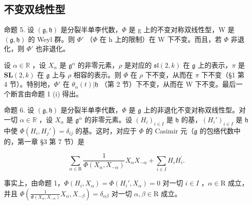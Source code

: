 \subsection{不变双线性型}

命题 5. 设 \((\mathfrak{g},\mathfrak{h})\) 是分裂半单李代数，\(\Phi\) 是 g 上的不变对称双线性型，W 是 \((\mathfrak{g},\mathfrak{h})\) 的 Weyl 群。则 \(\Phi'\) （\(\Phi\) 在 h 上的限制）在 W 下不变。而且，若 \(\Phi\) 非退化，则 \(\Phi'\) 也非退化。

设 \(\alpha \in \mathbb{R}\) ，设 \(X_{\alpha}\) 是 \(\mathfrak{g}^{\alpha}\) 的非零元素，\(\rho\) 是对应的 \(\mathfrak{sl}(2,k)\) 在 \(\mathfrak{g}\) 上的表示，\(\pi\) 是 \(\mathbf{SL}(2,k)\) 在 \(\mathfrak{g}\) 上与 \(\rho\) 相容的表示。则 \(\varPhi\) 在 \(\rho\) 下不变，从而在 \(\pi\) 下不变（§1 第 4 节）。特别地，\(\varPhi'\) 在 \(\theta_{\alpha}(t)|\mathfrak{h}\) （第 2 节）下不变，从而在 W 下不变。最后一个断言由命题 1 (i) 得出。

命题 6. 设 \((\mathfrak{g},\mathfrak{h})\) 是分裂半单李代数，\(\varPhi\) 是 \(\mathfrak{g}\) 上的非退化不变对称双线性型。对一切 \(\alpha \in \mathbb{R}\) ，设 \(X_{\alpha}\) 是 \(\mathfrak{g}^{\alpha}\) 的非零元素。设 \((H_i)_{i\in I}\) 是 \(\mathfrak{h}\) 的基，\((H_i')_{i\in I}\) 是 \(\mathfrak{h}\) 中使 \(\varPhi(H_i,H_j') = \delta_{ij}\) 的基。这时，对应于 \(\varPhi\) 的 Casimir 元（\(\mathfrak{g}\) 的包络代数中的，第一章 §3 第 7 节）是

\[
\sum_ {\alpha \in \mathrm{R}} \frac {1}{\varPhi (X _ {\alpha} , X _ {- \alpha})} X _ {\alpha} X _ {- \alpha} + \sum_ {i \in I} H _ {i} H _ {i} ^ {\prime}.
\]

事实上，由命题 1，\(\Phi(H_i, X_\alpha) = \Phi(H_i', X_\alpha) = 0\) 对一切 \(i \in I\) ，\(\alpha \in \mathrm{R}\) 成立，并且 \(\Phi\left(\frac{1}{\Phi(X_\alpha, X_{-\alpha})} X_\alpha, X_{-\beta}\right) = \delta_{\alpha\beta}\) 对一切 \(\alpha, \beta \in \mathrm{R}\) 成立。

